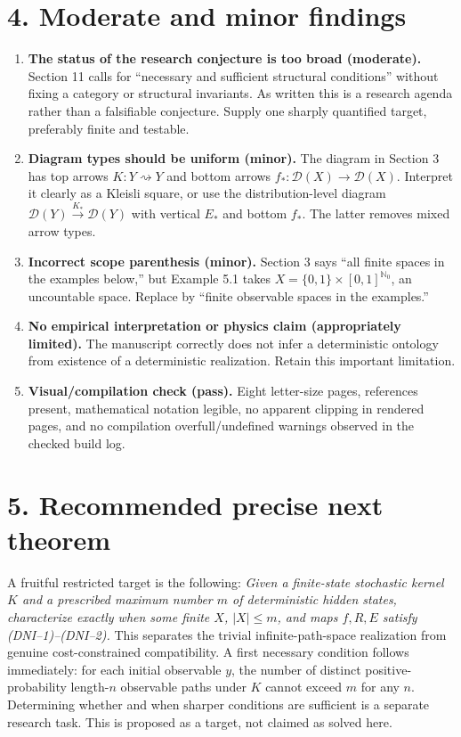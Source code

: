 \documentclass[11pt,letterpaper]{article}
\begin{document}
\section*{4. Moderate and minor findings}
\begin{enumerate}[label=\textbf{F\arabic*.}]
\item \textbf{The status of the research conjecture is too broad (moderate).} Section 11 calls for ``necessary and sufficient structural conditions'' without fixing a category or structural invariants. As written this is a research agenda rather than a falsifiable conjecture. Supply one sharply quantified target, preferably finite and testable.
\item \textbf{Diagram types should be uniform (minor).} The diagram in Section 3 has top arrows $K:Y\rightsquigarrow Y$ and bottom arrows $f_*:\mathcal D(X)\to\mathcal D(X)$. Interpret it clearly as a Kleisli square, or use the distribution-level diagram $\mathcal D(Y)\xrightarrow{K_*}\mathcal D(Y)$ with vertical $E_*$ and bottom $f_*$. The latter removes mixed arrow types.
\item \textbf{Incorrect scope parenthesis (minor).} Section 3 says ``all finite spaces in the examples below,'' but Example 5.1 takes $X=\{0,1\}\times [0,1]^{\mathbb N_0}$, an uncountable space. Replace by ``finite observable spaces in the examples.''
\item \textbf{No empirical interpretation or physics claim (appropriately limited).} The manuscript correctly does not infer a deterministic ontology from existence of a deterministic realization. Retain this important limitation.
\item \textbf{Visual/compilation check (pass).} Eight letter-size pages, references present, mathematical notation legible, no apparent clipping in rendered pages, and no compilation overfull/undefined warnings observed in the checked build log.
\end{enumerate}

\section*{5. Recommended precise next theorem}
A fruitful restricted target is the following: \emph{Given a finite-state stochastic kernel $K$ and a prescribed maximum number $m$ of deterministic hidden states, characterize exactly when some finite $X$, $|X|\le m$, and maps $f,R,E$ satisfy (DNI--1)--(DNI--2).} This separates the trivial infinite-path-space realization from genuine cost-constrained compatibility. A first necessary condition follows immediately: for each initial observable $y$, the number of distinct positive-probability length-$n$ observable paths under $K$ cannot exceed $m$ for any $n$. Determining whether and when sharper conditions are sufficient is a separate research task. This is proposed as a target, not claimed as solved here.
\end{document}
